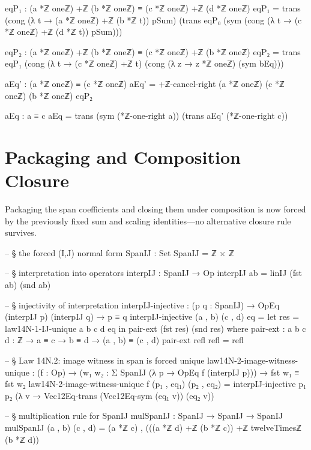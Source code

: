 \documentclass[11pt,a4paper]{book}
\begin{document}
\begin{code}
    eqP₁ : (a *ℤ oneℤ) +ℤ (b *ℤ oneℤ) ≡ (c *ℤ oneℤ) +ℤ (d *ℤ oneℤ)
    eqP₁ =
      trans (cong (λ t → (a *ℤ oneℤ) +ℤ (b *ℤ t)) pSum)
        (trans eqP₀ (sym (cong (λ t → (c *ℤ oneℤ) +ℤ (d *ℤ t)) pSum)))

    eqP₂ : (a *ℤ oneℤ) +ℤ (b *ℤ oneℤ) ≡ (c *ℤ oneℤ) +ℤ (b *ℤ oneℤ)
    eqP₂ =
      trans
        eqP₁
        (cong (λ t → (c *ℤ oneℤ) +ℤ t)
          (cong (λ z → z *ℤ oneℤ) (sym bEq)))

    aEq' : (a *ℤ oneℤ) ≡ (c *ℤ oneℤ)
    aEq' = +ℤ-cancel-right (a *ℤ oneℤ) (c *ℤ oneℤ) (b *ℤ oneℤ) eqP₂

    aEq : a ≡ c
    aEq =
      trans (sym (*ℤ-one-right a))
        (trans aEq' (*ℤ-one-right c))
\end{code}

\section{Packaging and Composition Closure}

Packaging the span coefficients and closing them under composition
is now forced by the previously fixed sum and scaling
identities---no alternative closure rule survives.

\begin{code}
-- § the forced (I,J) normal form
SpanIJ : Set
SpanIJ = ℤ × ℤ

-- § interpretation into operators
interpIJ : SpanIJ → Op
interpIJ ab = linIJ (fst ab) (snd ab)

-- § injectivity of interpretation
interpIJ-injective : (p q : SpanIJ) → OpEq (interpIJ p) (interpIJ q) → p ≡ q
interpIJ-injective (a , b) (c , d) eq =
  let res = law14N-1-IJ-unique a b c d eq in
  pair-ext (fst res) (snd res)
  where
    pair-ext : {a b c d : ℤ} → a ≡ c → b ≡ d → (a , b) ≡ (c , d)
    pair-ext refl refl = refl

-- § Law 14N.2: image witness in span is forced unique
law14N-2-image-witness-unique :
  (f : Op) →
  (w₁ w₂ : Σ SpanIJ (λ p → OpEq f (interpIJ p))) →
  fst w₁ ≡ fst w₂
law14N-2-image-witness-unique f (p₁ , eq₁) (p₂ , eq₂) =
  interpIJ-injective p₁ p₂ (λ v → Vec12Eq-trans (Vec12Eq-sym (eq₁ v)) (eq₂ v))

-- § multiplication rule for SpanIJ
mulSpanIJ : SpanIJ → SpanIJ → SpanIJ
mulSpanIJ (a , b) (c , d) = (a *ℤ c) , (((a *ℤ d) +ℤ (b *ℤ c)) +ℤ twelveTimesℤ (b *ℤ d))
\end{code}
\end{document}

